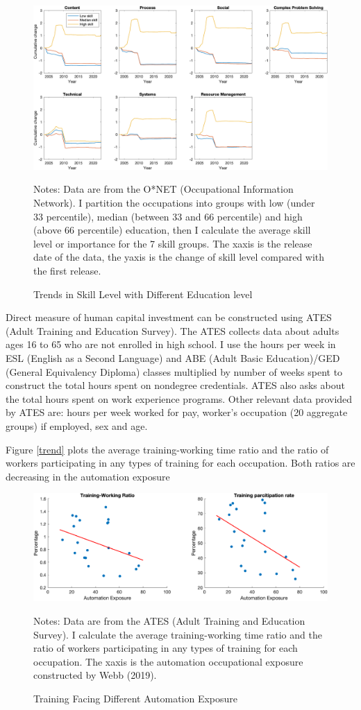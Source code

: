 \documentclass[12pt]{article}
\begin{document}
\begin{figure}[h!]
\includegraphics[width = \textwidth]{LV_trend2}
\caption{Trends in Skill Level with Different Education level}
\label{IM_trend}
{\scriptsize Notes: Data are from the O*NET (Occupational Information Network). I partition the occupations into groups with low (under 33 percentile), median (between 33 and 66 percentile) and high (above 66 percentile) education, then I calculate the average skill level or importance for the 7 skill groups. The xaxis is the release date of the data, the yaxis is the change of skill level compared with the first release. }
\end{figure}

Direct measure of human capital investment can be constructed using ATES (Adult Training and Education Survey). The ATES collects data about adults ages 16 to 65 who are not enrolled in high school. I use the hours per week in ESL (English as a Second Language) and ABE (Adult Basic Education)/GED (General Equivalency Diploma) classes multiplied by number of weeks spent to construct the total hours spent on nondegree credentials. ATES also asks about the total hours spent on work experience programs. Other relevant data provided by ATES are: hours per week worked for pay, worker's occupation (20 aggregate groups) if employed, sex and age. 

Figure \ref{trend} plots the average training-working time ratio and the ratio of workers participating in any types of training for each occupation. Both ratios are decreasing in the automation exposure 
\begin{figure}[h!]
\includegraphics[width = \textwidth]{train}
\caption{Training Facing Different Automation Exposure}
{\scriptsize Notes: Data are from the ATES (Adult Training and Education Survey). I calculate the average training-working time ratio and the ratio of workers participating in any types of training for each occupation. The xaxis is the automation occupational exposure constructed by Webb (2019).}
\label{train}
\end{figure}
\end{document}
